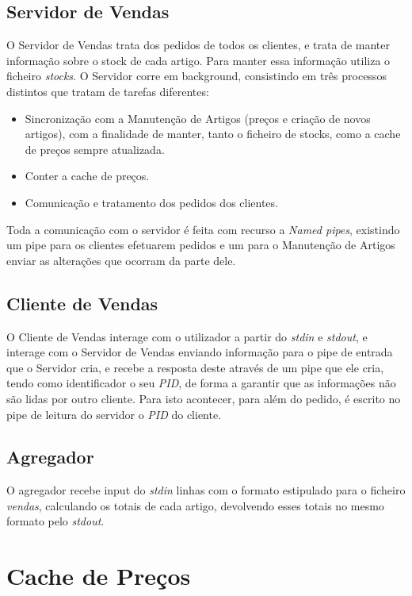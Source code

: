\documentclass[a4paper]{report}
\begin{document}
\section{Servidor de Vendas}

O Servidor de Vendas trata dos pedidos de todos os clientes, e trata de 
manter informação sobre o stock de cada artigo. Para manter essa informação
utiliza o ficheiro \textit{stocks}. O Servidor corre em background, consistindo
em três processos distintos que tratam de tarefas diferentes:
\begin{itemize} 
    \item Sincronização com a Manutenção de Artigos
        (preços e criação de novos artigos), com a finalidade de manter,
        tanto o ficheiro de stocks, como a cache de preços sempre atualizada.
    \item Conter a cache de preços.
    \item Comunicação e tratamento dos pedidos dos clientes.
\end{itemize}
Toda a comunicação com o servidor é feita com recurso a \textit{Named pipes},
existindo um pipe para os clientes efetuarem pedidos e um para o Manutenção
de Artigos enviar as alterações que ocorram da parte dele.

\section{Cliente de Vendas}

O Cliente de Vendas interage com o utilizador a partir do \textit{stdin} e 
\textit{stdout}, e interage com o Servidor de Vendas enviando informação
para o pipe de entrada que o Servidor cria, e recebe a resposta deste
através de um pipe que ele cria, tendo como identificador o seu \textit{PID},
de forma a garantir que as informações não são lidas por outro cliente.
Para isto acontecer, para além do pedido, é escrito no pipe de leitura do
servidor o \textit{PID} do cliente.

\section{Agregador}

O agregador recebe input do \textit{stdin} linhas com o formato estipulado
para o ficheiro \textit{vendas}, calculando os totais de cada artigo,
devolvendo esses totais no mesmo formato pelo \textit{stdout}.

\chapter{Cache de Preços}
\end{document}
